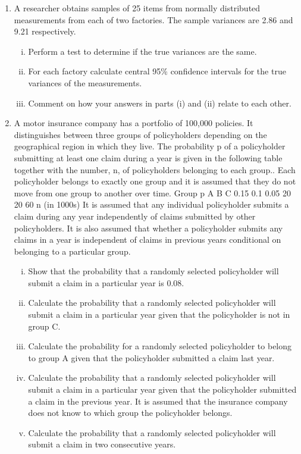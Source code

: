 \documentclass[a4paper,12pt]{article}
\begin{document}
\begin{enumerate}

\item A researcher obtains samples of 25 items from normally distributed measurements
from each of two factories. The sample variances are 2.86 and 9.21 respectively.
\begin{enumerate}[(i)]
\item Perform a test to determine if the true variances are the same. 
\item  For each factory calculate central 95\% confidence intervals for the true
variances of the measurements. 
\item 
Comment on how your answers in parts (i) and (ii) relate to each other.
\end{enumerate}
\item %
A motor insurance company has a portfolio of 100,000 policies. It distinguishes
between three groups of policyholders depending on the geographical region in which they live. The probability p of a policyholder submitting at least one claim during a year is given in the following table together with the number, n, of policyholders belonging to each group.. Each policyholder belongs to exactly one group and it is
assumed that they do not move from one group to another over time.
Group
p
A
B
C
0.15 0.1 0.05
20 20 60
n (in 1000s)
It is assumed that any individual policyholder submits a claim during any year
independently of claims submitted by other policyholders. It is also assumed that
whether a policyholder submits any claims in a year is independent of claims in
previous years conditional on belonging to a particular group.

\begin{enumerate}[(i)]
\item Show that the probability that a randomly selected policyholder will submit a claim in a particular year is 0.08.

\item Calculate the probability that a randomly selected policyholder will submit a claim in a particular year given that the policyholder is not in group C.

\item Calculate the probability for a randomly selected policyholder to belong to
group A given that the policyholder submitted a claim last year.

\item Calculate the probability that a randomly selected policyholder will submit a
claim in a particular year given that the policyholder submitted a claim in the
previous year. It is assumed that the insurance company does not know to
which group the policyholder belongs.

\item Calculate the probability that a randomly selected policyholder will submit a
claim in two consecutive years.
\end{enumerate}

\end{enumerate}
\end{document}
